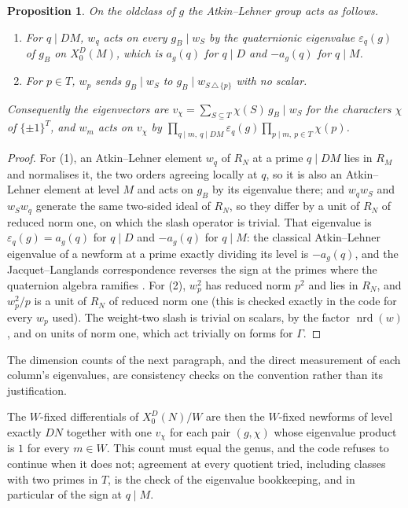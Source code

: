\documentclass[11pt,reqno]{amsart}
\theoremstyle{plain}
\newtheorem{proposition}[theorem]{Proposition}
\theoremstyle{definition}
\DeclareMathOperator{\nrd}{nrd}
\begin{document}
\begin{proposition}\label{prop:oldclass}
On the oldclass of $g$ the Atkin--Lehner group acts as follows.
\begin{enumerate}
\item For $q\mid DM$, $w_q$ acts on every $g_B\mid w_S$ by the quaternionic eigenvalue
$\varepsilon_q(g)$ of $g_B$ on $X_0^D(M)$, which is $a_g(q)$ for $q\mid D$ and $-a_g(q)$ for
$q\mid M$.
\item For $p\in T$, $w_p$ sends $g_B\mid w_S$ to $g_B\mid w_{S\,\triangle\,\{p\}}$ with no scalar.
\end{enumerate}
Consequently the eigenvectors are $v_\chi=\sum_{S\subseteq T}\chi(S)\,g_B\mid w_S$ for the
characters $\chi$ of $\{\pm1\}^T$, and $w_m$ acts on $v_\chi$ by
$\prod_{q\mid m,\ q\mid DM}\varepsilon_q(g)\prod_{p\mid m,\ p\in T}\chi(p)$.
\end{proposition}

\begin{proof}
For (1), an Atkin--Lehner element $w_q$ of $R_N$ at a prime $q\mid DM$ lies in $R_M$ and
normalises it, the two orders agreeing locally at $q$, so it is also an Atkin--Lehner element at
level $M$ and acts on $g_B$ by its eigenvalue there; and $w_qw_S$ and $w_Sw_q$ generate the same
two-sided ideal of $R_N$, so they differ by a unit of $R_N$ of reduced norm one, on which the
slash operator is trivial. That eigenvalue is $\varepsilon_q(g)=a_g(q)$ for $q\mid D$ and
$-a_g(q)$ for $q\mid M$: the classical Atkin--Lehner eigenvalue of a newform at a prime exactly
dividing its level is $-a_g(q)$, and the Jacquet--Langlands correspondence reverses the sign at
the primes where the quaternion algebra ramifies \cite{JL,Voight}.
For (2), $w_p^2$ has reduced norm $p^2$ and lies in $R_N$, and $w_p^2/p$ is a unit of $R_N$ of
reduced norm one (this is checked exactly in the code for every $w_p$ used). The weight-two slash
is trivial on scalars, by the factor $\nrd(w)$, and on units of norm one, which act trivially on
forms for $\Gamma$.
\end{proof}

The dimension counts of the next paragraph, and the direct measurement of each column's
eigenvalues, are consistency checks on the convention rather than its justification.

The $W$-fixed differentials of $X_0^D(N)/W$ are then the $W$-fixed newforms of level exactly
$DN$ together with one $v_\chi$ for each pair $(g,\chi)$ whose eigenvalue product is $1$ for every
$m\in W$. This count must equal the genus, and the code refuses to continue when it does not;
agreement at every quotient tried, including classes with two primes in $T$, is the check of the
eigenvalue bookkeeping, and in particular of the sign at $q\mid M$.
\end{document}
